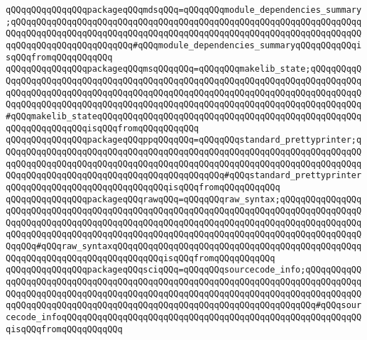 \verb|qQQqqQQqqQQqqQQqpackageqQQqmdsqQQq=qQQqqQQqmodule_dependencies_summary;qQQqqQQqqQQqqQQqqQQqqQQqqQQqqQQqqQQqqQQqqQQqqQQqqQQqqQQqqQQqqQQqqQQqqQQqqQQqqQQqqQQqqQQqqQQqqQQqqQQqqQQqqQQqqQQqqQQqqQQqqQQqqQQqqQQqqQQqqQQqqQQqqQQqqQQqqQQqqQQqqQQq#qQQqmodule_dependencies_summaryqQQqqQQqqQQqisqQQqfromqQQqqQQqqQQq|\newline
\verb|qQQqqQQqqQQqqQQqpackageqQQqmsqQQqqQQq=qQQqqQQqmakelib_state;qQQqqQQqqQQqqQQqqQQqqQQqqQQqqQQqqQQqqQQqqQQqqQQqqQQqqQQqqQQqqQQqqQQqqQQqqQQqqQQqqQQqqQQqqQQqqQQqqQQqqQQqqQQqqQQqqQQqqQQqqQQqqQQqqQQqqQQqqQQqqQQqqQQqqQQqqQQqqQQqqQQqqQQqqQQqqQQqqQQqqQQqqQQqqQQqqQQqqQQqqQQqqQQqqQQqqQQqqQQq#qQQqmakelib_stateqQQqqQQqqQQqqQQqqQQqqQQqqQQqqQQqqQQqqQQqqQQqqQQqqQQqqQQqqQQqqQQqqQQqisqQQqfromqQQqqQQqqQQq|\newline
\verb|qQQqqQQqqQQqqQQqpackageqQQqppqQQqqQQq=qQQqqQQqstandard_prettyprinter;qQQqqQQqqQQqqQQqqQQqqQQqqQQqqQQqqQQqqQQqqQQqqQQqqQQqqQQqqQQqqQQqqQQqqQQqqQQqqQQqqQQqqQQqqQQqqQQqqQQqqQQqqQQqqQQqqQQqqQQqqQQqqQQqqQQqqQQqqQQqqQQqqQQqqQQqqQQqqQQqqQQqqQQqqQQqqQQqqQQqqQQq#qQQqstandard_prettyprinterqQQqqQQqqQQqqQQqqQQqqQQqqQQqqQQqisqQQqfromqQQqqQQqqQQq|\newline
\verb|qQQqqQQqqQQqqQQqpackageqQQqrawqQQq=qQQqqQQqraw_syntax;qQQqqQQqqQQqqQQqqQQqqQQqqQQqqQQqqQQqqQQqqQQqqQQqqQQqqQQqqQQqqQQqqQQqqQQqqQQqqQQqqQQqqQQqqQQqqQQqqQQqqQQqqQQqqQQqqQQqqQQqqQQqqQQqqQQqqQQqqQQqqQQqqQQqqQQqqQQqqQQqqQQqqQQqqQQqqQQqqQQqqQQqqQQqqQQqqQQqqQQqqQQqqQQqqQQqqQQqqQQqqQQqqQQqqQQq#qQQqraw_syntaxqQQqqQQqqQQqqQQqqQQqqQQqqQQqqQQqqQQqqQQqqQQqqQQqqQQqqQQqqQQqqQQqqQQqqQQqqQQqqQQqisqQQqfromqQQqqQQqqQQq|\newline
\verb|qQQqqQQqqQQqqQQqpackageqQQqsciqQQq=qQQqqQQqsourcecode_info;qQQqqQQqqQQqqQQqqQQqqQQqqQQqqQQqqQQqqQQqqQQqqQQqqQQqqQQqqQQqqQQqqQQqqQQqqQQqqQQqqQQqqQQqqQQqqQQqqQQqqQQqqQQqqQQqqQQqqQQqqQQqqQQqqQQqqQQqqQQqqQQqqQQqqQQqqQQqqQQqqQQqqQQqqQQqqQQqqQQqqQQqqQQqqQQqqQQqqQQqqQQqqQQqqQQq#qQQqsourcecode_infoqQQqqQQqqQQqqQQqqQQqqQQqqQQqqQQqqQQqqQQqqQQqqQQqqQQqqQQqqQQqisqQQqfromqQQqqQQqqQQq|\newline
